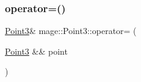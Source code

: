 \hypertarget{structmage_1_1_point3_a6889dad6ac4106bd9a52fcae4dfa401c}{}\label{structmage_1_1_point3_a6889dad6ac4106bd9a52fcae4dfa401c} 
\subsubsection{\texorpdfstring{operator=()}{operator=()}\hspace{0.1cm}{\footnotesize\ttfamily [2/2]}}
{\footnotesize\ttfamily \hyperlink{structmage_1_1_point3}{Point3}\& mage\+::\+Point3\+::operator= (\begin{DoxyParamCaption}\item[{\hyperlink{structmage_1_1_point3}{Point3} \&\&}]{point }\end{DoxyParamCaption})}

